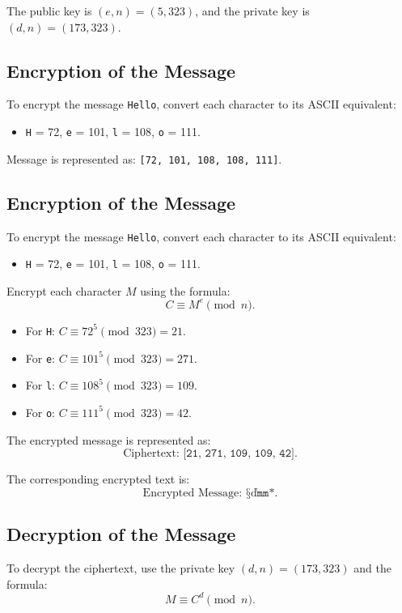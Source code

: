 \documentclass[12pt,a4paper]{report}
\begin{document}
The public key is \( (e, n) = (5, 323) \), and the private key is \( (d, n) = (173, 323) \).

\subsection{Encryption of the Message}
To encrypt the message \texttt{Hello}, convert each character to its ASCII equivalent:
\begin{itemize}
    \item \texttt{H} = 72, \texttt{e} = 101, \texttt{l} = 108, \texttt{o} = 111.
\end{itemize}

Message is represented as: \texttt{[72, 101, 108, 108, 111]}.

\subsection{Encryption of the Message}
To encrypt the message \texttt{Hello}, convert each character to its ASCII equivalent:
\begin{itemize}
    \item \texttt{H} = 72, \texttt{e} = 101, \texttt{l} = 108, \texttt{o} = 111.
\end{itemize}

Encrypt each character \( M \) using the formula:
\[
C \equiv M^e \pmod{n}.
\]

\begin{itemize}
    \item For \texttt{H}: \( C \equiv 72^5 \pmod{323} = 21 \).
    \item For \texttt{e}: \( C \equiv 101^5 \pmod{323} = 271 \).
    \item For \texttt{l}: \( C \equiv 108^5 \pmod{323} = 109 \).
    \item For \texttt{o}: \( C \equiv 111^5 \pmod{323} = 42 \).
\end{itemize}

The encrypted message is represented as:
\[
\text{Ciphertext: } \texttt{[21, 271, 109, 109, 42]}.
\]

The corresponding encrypted text is:
\[
\text{Encrypted Message: } \texttt{§ďmm*}.
\]

\subsection{Decryption of the Message}
To decrypt the ciphertext, use the private key \( (d, n) = (173, 323) \) and the formula:
\[
M \equiv C^d \pmod{n}.
\]
\end{document}
